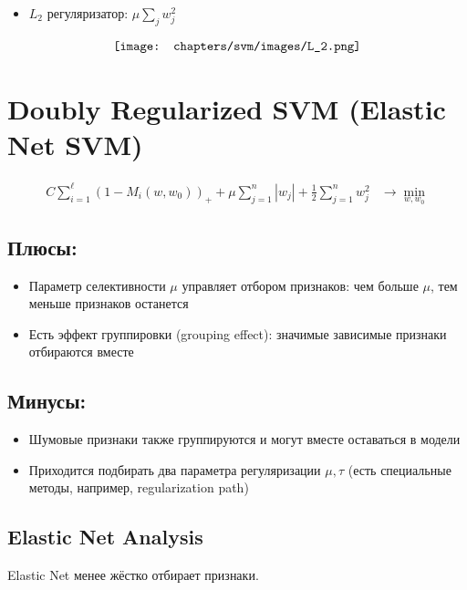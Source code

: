 \begin{itemize}
    \item \(L_2\) регуляризатор: \(\mu \sum_{j} w_j^2\)
\end{itemize}

\begin{align*}
    \centering
    \texttt{[image: chapters/svm/images/L\_2.png]}
    \label{fig:image}    
\end{align*}

\section{Doubly Regularized SVM (Elastic Net SVM)}

\begin{align*}
    C \sum_{i=1}^{\ell} \left(1 - M_i(w, w_0)\right)_+ + \mu \sum_{j=1}^{n} |w_j| + \frac{1}{2} \sum_{j=1}^{n} w_j^2 & \rightarrow \min_{w, w_0}
\end{align*}

\subsection*{Плюсы:}
\begin{itemize}
    \item Параметр селективности \(\mu\) управляет отбором признаков: чем больше \(\mu\), тем меньше признаков останется
    \item Есть эффект группировки (grouping effect): значимые зависимые признаки отбираются вместе
\end{itemize}

\subsection*{Минусы:}
\begin{itemize}
    \item Шумовые признаки также группируются и могут вместе оставаться в модели
    \item Приходится подбирать два параметра регуляризации \(\mu, \tau\) (есть специальные методы, например, regularization path)
\end{itemize}

\subsection{Elastic Net Analysis}

Elastic Net менее жёстко отбирает признаки.

